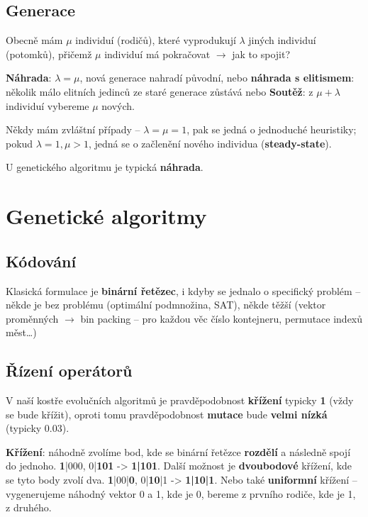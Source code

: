 \subsection{Generace}

Obecně mám $\mu$ individuí (rodičů), které vyprodukují $\lambda$ jiných individuí (potomků), přičemž $\mu$ individuí má pokračovat $\to$ jak to spojit?

\vspace{4pt}
\noindent \textbf{Náhrada}: $\lambda = \mu$, nová generace nahradí původní, nebo \textbf{náhrada s elitismem}: několik málo elitních jedinců ze staré generace zůstává nebo \textbf{Soutěž}: z $\mu + \lambda$ individuí vybereme $\mu$ nových.

\vspace{4pt}
\noindent Někdy mám zvláštní případy -- $\lambda = \mu = 1$, pak se jedná o jednoduché heuristiky; pokud $\lambda = 1, \mu > 1$, jedná se o začlenění nového individua (\textbf{steady-state}).

\vspace{4pt}
\noindent U genetického algoritmu je typická \textbf{náhrada}.


\newpage
\section{Genetické algoritmy}

\subsection{Kódování}

Klasická formulace je \textbf{binární řetězec}, i kdyby se jednalo o specifický problém -- někde je bez problému (optimální podmnožina, SAT), někde těžší (vektor proměnných $\to$ bin packing -- pro každou věc číslo kontejneru, permutace indexů měst\ldots)

\subsection{Řízení operátorů}

V naší kostře evolučních algoritmů je pravděpodobnost \textbf{křížení} typicky \textbf{1} (vždy se bude křížit), oproti tomu pravděpodobnost \textbf{mutace} bude \textbf{velmi nízká} (typicky $0.03$).

\vspace{4pt}
\noindent \textbf{Křížení}: náhodně zvolíme bod, kde se binární řetězce \textbf{rozdělí} a následně spojí do jednoho. \textbf{1}|000, 0|\textbf{101} -> \textbf{1|101}. Další možnost je \textbf{dvoubodové} křížení, kde se tyto body zvolí dva. \textbf{1}|00|\textbf{0}, 0|\textbf{10}|1 -> \textbf{1|10|1}. Nebo také \textbf{uniformní} křížení -- vygenerujeme náhodný vektor 0 a 1, kde je 0, bereme z prvního rodiče, kde je 1, z druhého.

